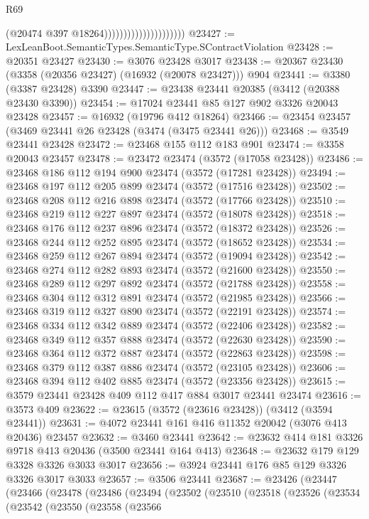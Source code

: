 \begin{lexlean}{R69}
\begin{coremodule}
                                            (@20474 @397 @18264)))))))))))))))))))))
@23427 := LexLeanBoot.SemanticTypes.SemanticType.SContractViolation
@23428 := @20351 @23427
@23430 := @3076 @23428 @3017
@23438 := @20367 @23430 (@3358 (@20356 @23427) (@16932 (@20078 @23427))) @904
@23441 := @3380 (@3387 @23428) @3390
@23447 := @23438 @23441 @20385 (@3412 (@20388 @23430 @3390))
@23454 := @17024 @23441 @85 @127 @902 @3326 @20043 @23428
@23457 := @16932 (@19796 @412 @18264)
@23466 := @23454 @23457 (@3469 @23441 @26 @23428 (@3474 (@3475 @23441 @26)))
@23468 := @3549 @23441 @23428
@23472 := @23468 @155 @112 @183 @901
@23474 := @3358 @20043 @23457
@23478 := @23472 @23474 (@3572 (@17058 @23428))
@23486 := @23468 @186 @112 @194 @900 @23474 (@3572 (@17281 @23428))
@23494 := @23468 @197 @112 @205 @899 @23474 (@3572 (@17516 @23428))
@23502 := @23468 @208 @112 @216 @898 @23474 (@3572 (@17766 @23428))
@23510 := @23468 @219 @112 @227 @897 @23474 (@3572 (@18078 @23428))
@23518 := @23468 @176 @112 @237 @896 @23474 (@3572 (@18372 @23428))
@23526 := @23468 @244 @112 @252 @895 @23474 (@3572 (@18652 @23428))
@23534 := @23468 @259 @112 @267 @894 @23474 (@3572 (@19094 @23428))
@23542 := @23468 @274 @112 @282 @893 @23474 (@3572 (@21600 @23428))
@23550 := @23468 @289 @112 @297 @892 @23474 (@3572 (@21788 @23428))
@23558 := @23468 @304 @112 @312 @891 @23474 (@3572 (@21985 @23428))
@23566 := @23468 @319 @112 @327 @890 @23474 (@3572 (@22191 @23428))
@23574 := @23468 @334 @112 @342 @889 @23474 (@3572 (@22406 @23428))
@23582 := @23468 @349 @112 @357 @888 @23474 (@3572 (@22630 @23428))
@23590 := @23468 @364 @112 @372 @887 @23474 (@3572 (@22863 @23428))
@23598 := @23468 @379 @112 @387 @886 @23474 (@3572 (@23105 @23428))
@23606 := @23468 @394 @112 @402 @885 @23474 (@3572 (@23356 @23428))
@23615 := @3579 @23441 @23428 @409 @112 @417 @884 @3017 @23441 @23474
@23616 := @3573 @409
@23622 := @23615 (@3572 (@23616 @23428)) (@3412 (@3594 @23441))
@23631 := @4072 @23441 @161 @416 @11352 @20042 (@3076 @413 @20436) @23457
@23632 := @3460 @23441
@23642 := @23632 @414 @181 @3326 @9718 @413 @20436 (@3500 @23441 @164 @413)
@23648 := @23632 @179 @129 @3328 @3326 @3033 @3017
@23656 := @3924 @23441 @176 @85 @129 @3326 @3326 @3017 @3033
@23657 := @3506 @23441
@23687 := @23426
    (@23447
      (@23466
        (@23478
          (@23486
            (@23494
              (@23502
                (@23510
                  (@23518
                    (@23526
                      (@23534
                        (@23542
                          (@23550
                            (@23558
                              (@23566

\end{coremodule}
\end{lexlean}
